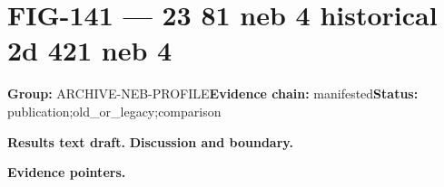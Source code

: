 \clearpage
\section{FIG-141 --- 23 81 neb 4 historical 2d 421 neb 4}
\label{figpage:fig-141}
\textbf{Group:} ARCHIVE-NEB-PROFILE\quad \textbf{Evidence chain:} manifested\quad \textbf{Status:} publication;old\_or\_legacy;comparison

\textbf{Results text draft.} 
\textbf{Discussion and boundary.} 


\textbf{Evidence pointers.}



\vfill

